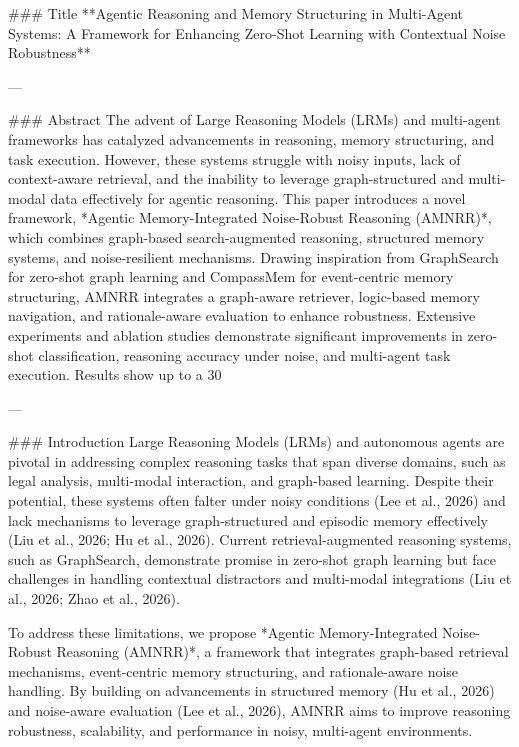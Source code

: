 ### Title  
**Agentic Reasoning and Memory Structuring in Multi-Agent Systems: A Framework for Enhancing Zero-Shot Learning with Contextual Noise Robustness**

---

### Abstract  
The advent of Large Reasoning Models (LRMs) and multi-agent frameworks has catalyzed advancements in reasoning, memory structuring, and task execution. However, these systems struggle with noisy inputs, lack of context-aware retrieval, and the inability to leverage graph-structured and multi-modal data effectively for agentic reasoning. This paper introduces a novel framework, *Agentic Memory-Integrated Noise-Robust Reasoning (AMNRR)*, which combines graph-based search-augmented reasoning, structured memory systems, and noise-resilient mechanisms. Drawing inspiration from GraphSearch for zero-shot graph learning and CompassMem for event-centric memory structuring, AMNRR integrates a graph-aware retriever, logic-based memory navigation, and rationale-aware evaluation to enhance robustness. Extensive experiments and ablation studies demonstrate significant improvements in zero-shot classification, reasoning accuracy under noise, and multi-agent task execution. Results show up to a 30%

---

### Introduction  
Large Reasoning Models (LRMs) and autonomous agents are pivotal in addressing complex reasoning tasks that span diverse domains, such as legal analysis, multi-modal interaction, and graph-based learning. Despite their potential, these systems often falter under noisy conditions (Lee et al., 2026) and lack mechanisms to leverage graph-structured and episodic memory effectively (Liu et al., 2026; Hu et al., 2026). Current retrieval-augmented reasoning systems, such as GraphSearch, demonstrate promise in zero-shot graph learning but face challenges in handling contextual distractors and multi-modal integrations (Liu et al., 2026; Zhao et al., 2026).  

To address these limitations, we propose *Agentic Memory-Integrated Noise-Robust Reasoning (AMNRR)*, a framework that integrates graph-based retrieval mechanisms, event-centric memory structuring, and rationale-aware noise handling. By building on advancements in structured memory (Hu et al., 2026) and noise-aware evaluation (Lee et al., 2026), AMNRR aims to improve reasoning robustness, scalability, and performance in noisy, multi-agent environments.

